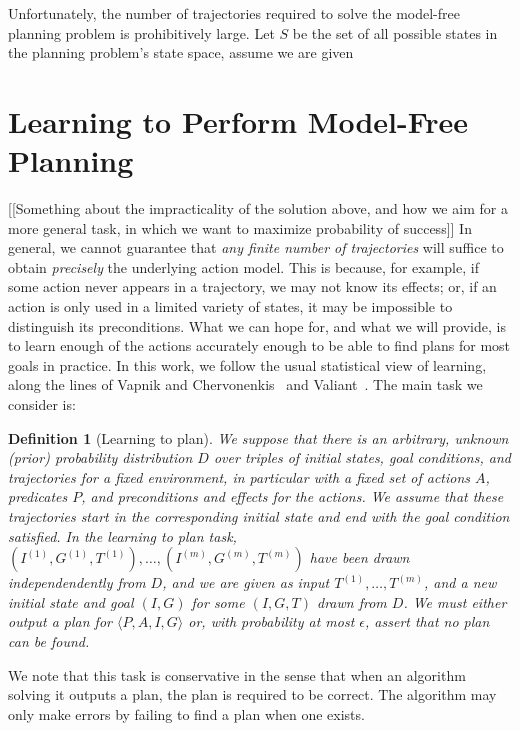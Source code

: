 \documentclass[letterpaper]{article}
\newtheorem{definition}{Definition}
\begin{document}
Unfortunately, the number of trajectories required to solve the model-free planning problem is prohibitively large.
Let $S$ be the set of all possible states in the planning problem's state space, 
assume we are given 


\section{Learning to Perform Model-Free Planning}
[[Something about the impracticality of the solution above, and how we aim for a more general task, in which we want to maximize probability of success]]
In general, we cannot guarantee that {\em any finite number of trajectories} will suffice to obtain {\em precisely} the underlying action model. This is because, for example, if some action never appears in a trajectory, we may not know its effects; or, if an action is only used in a limited variety of states, it may be impossible to distinguish its preconditions. What we can hope for, and what we will provide, is to learn enough of the actions accurately enough to be able to find plans for most goals in practice.
In this work, we follow the usual statistical view of learning, along the lines of Vapnik and Chervonenkis~ and Valiant~. The main task we consider is:

\begin{definition}[Learning to plan] We suppose that there is an arbitrary, unknown (prior) probability distribution $D$ over triples of initial states, goal conditions, and trajectories for a fixed environment, in particular with a fixed set of actions $A$, predicates $P$, and preconditions and effects for the actions. We assume that these trajectories start in the corresponding initial state and end with the goal condition satisfied. In the {\em learning to plan} task, $(I^{(1)},G^{(1)},T^{(1)}),\ldots,(I^{(m)},G^{(m)},T^{(m)})$ have been drawn independendently from $D$, and we are given as input $T^{(1)},\ldots,T^{(m)}$, and a new initial state and goal $(I,G)$ for some $(I,G,T)$ drawn from $D$. We must either output a plan for $\langle P,A,I,G\rangle$ or, with probability at most $\epsilon$, assert that no plan can be found.
\end{definition}

We note that this task is conservative in the sense that when an algorithm solving it outputs a plan, the plan is required to be correct. The algorithm may only make errors by failing to find a plan when one exists.
\end{document}
